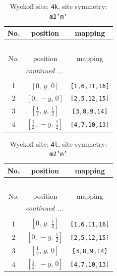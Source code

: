 \documentclass[fleqn,8pt]{jsarticle}
\begin{document}
\renewcommand{\arraystretch}{1.2}
\begin{longtable}{ccc}
\caption{Wyckoff site: {\tt 4k}, site symmetry: {\tt m2'm'}}
 \\
 \hline \hline
No. & position & mapping \\ \hline \endfirsthead

\multicolumn{2}{l}{\tablename\ \thetable{}} \\
 \hline \hline
No. & position & mapping \\ \hline \endhead

 \hline \hline
\multicolumn{2}{r}{\footnotesize\it continued ...} \\ \endfoot

 \hline \hline
\multicolumn{2}{r}{} \\ \endlastfoot

1 & $\left[ 0,\, y,\, 0 \right]$ & {\tt [1,6,11,16]} \\ \hline
2 & $\left[ 0,\, - y,\, 0 \right]$ & {\tt [2,5,12,15]} \\ \hline
3 & $\left[ \frac{1}{2},\, y,\, \frac{1}{2} \right]$ & {\tt [3,8,9,14]} \\ \hline
4 & $\left[ \frac{1}{2},\, - y,\, \frac{1}{2} \right]$ & {\tt [4,7,10,13]} \\
\end{longtable}
\renewcommand{\arraystretch}{1.2}
\begin{longtable}{ccc}
\caption{Wyckoff site: {\tt 4l}, site symmetry: {\tt m2'm'}}
 \\
 \hline \hline
No. & position & mapping \\ \hline \endfirsthead

\multicolumn{2}{l}{\tablename\ \thetable{}} \\
 \hline \hline
No. & position & mapping \\ \hline \endhead

 \hline \hline
\multicolumn{2}{r}{\footnotesize\it continued ...} \\ \endfoot

 \hline \hline
\multicolumn{2}{r}{} \\ \endlastfoot

1 & $\left[ 0,\, y,\, \frac{1}{2} \right]$ & {\tt [1,6,11,16]} \\ \hline
2 & $\left[ 0,\, - y,\, \frac{1}{2} \right]$ & {\tt [2,5,12,15]} \\ \hline
3 & $\left[ \frac{1}{2},\, y,\, 0 \right]$ & {\tt [3,8,9,14]} \\ \hline
4 & $\left[ \frac{1}{2},\, - y,\, 0 \right]$ & {\tt [4,7,10,13]} \\
\end{longtable}
\end{document}
